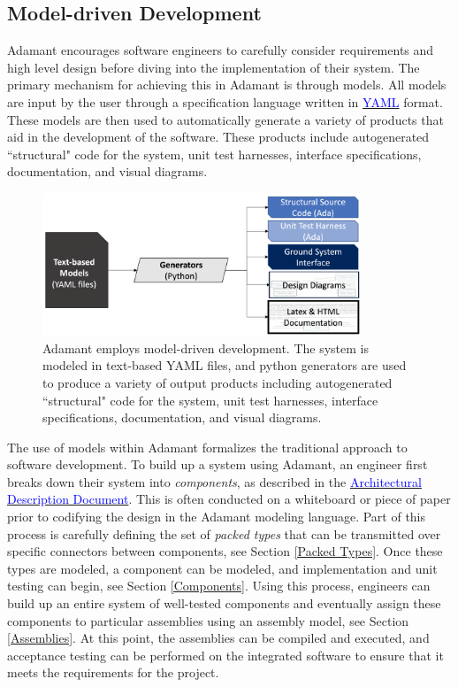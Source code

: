 \subsection{Model-driven Development}

Adamant encourages software engineers to carefully consider requirements and high level design before diving into the implementation of their system. The primary mechanism for achieving this in Adamant is through models. All models are input by the user through a specification language written in \href{http://yaml.org}{\textcolor{blue}{YAML}} format. These models are then used to automatically generate a variety of products that aid in the development of the software. These products include autogenerated ``structural" code for the system, unit test harnesses, interface specifications, documentation, and visual diagrams.

\begin{figure}[H]
  \includegraphics[width=0.85\textwidth,center]{images/modelbased.png}
  \caption{Adamant employs model-driven development. The system is modeled in text-based YAML files, and python generators are used to produce a variety of output products including autogenerated ``structural" code for the system, unit test harnesses, interface specifications, documentation, and visual diagrams.}
\end{figure}

The use of models within Adamant formalizes the traditional approach to software development. To build up a system using Adamant, an engineer first breaks down their system into \textit{components}, as described in the \href{https://github.com/lasp/adamant/blob/main/doc/architecture_description_document/architecture_description_document.pdf}{\textcolor{blue}{Architectural Description Document}}. This is often conducted on a whiteboard or piece of paper prior to codifying the design in the Adamant modeling language. Part of this process is carefully defining the set of \textit{packed types} that can be transmitted over specific connectors between components, see Section \ref{Packed Types}. Once these types are modeled, a component can be modeled, and implementation and unit testing can begin, see Section \ref{Components}. Using this process, engineers can build up an entire system of well-tested components and eventually assign these components to particular assemblies using an assembly model, see Section \ref{Assemblies}. At this point, the assemblies can be compiled and executed, and acceptance testing can be performed on the integrated software to ensure that it meets the requirements for the project.

